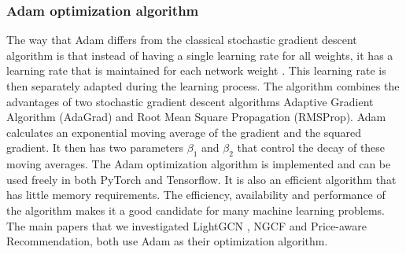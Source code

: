 \subsubsection{Adam optimization algorithm}\label{subsubsec:Adam}
The way that Adam differs from the classical stochastic gradient descent algorithm is that instead of having a single learning rate for all weights, it has a learning rate that is maintained for each network weight \cite{Adam}.
This learning rate is then separately adapted during the learning process.
The algorithm combines the advantages of two stochastic gradient descent algorithms Adaptive Gradient Algorithm (AdaGrad) and Root Mean Square Propagation (RMSProp).
Adam calculates an exponential moving average of the gradient and the squared gradient.
It then has two parameters $\beta_1$ and $\beta_2$ that control the decay of these moving averages.
The Adam optimization algorithm is implemented and can be used freely in both PyTorch and Tensorflow.
It is also an efficient algorithm that has little memory requirements.
The efficiency, availability and performance of the algorithm makes it a good candidate for many machine learning problems.
The main papers that we investigated LightGCN \cite{lightgcn}, NGCF \cite{NGCF_2019} and Price-aware Recommendation\cite{Priceaware}, both use Adam as their optimization algorithm.
